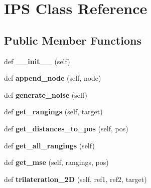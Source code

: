 \hypertarget{class_emulator_1_1_i_p_s}{}\section{I\+PS Class Reference}
\label{class_emulator_1_1_i_p_s}
\subsection*{Public Member Functions}
\begin{DoxyCompactItemize}
\item 
\mbox{\label{class_emulator_1_1_i_p_s_ae64f0875afe3067b97ba370b354b9213}} 
def {\bfseries \+\_\+\+\_\+init\+\_\+\+\_\+} (self)
\item 
\mbox{\label{class_emulator_1_1_i_p_s_ad592726fe518f08b2610e36f73323607}} 
def {\bfseries append\+\_\+node} (self, node)
\item 
\mbox{\label{class_emulator_1_1_i_p_s_ac678816339dde4c5fd312b183fbef3c7}} 
def {\bfseries generate\+\_\+noise} (self)
\item 
\mbox{\label{class_emulator_1_1_i_p_s_a7d42c4dff24af89bed35e9502f4a66d3}} 
def {\bfseries get\+\_\+rangings} (self, target)
\item 
\mbox{\label{class_emulator_1_1_i_p_s_a94acd9ee416f26c86fc973a2bb066bf9}} 
def {\bfseries get\+\_\+distances\+\_\+to\+\_\+pos} (self, pos)
\item 
\mbox{\label{class_emulator_1_1_i_p_s_a5da9a769fdf928d993b2c1d0cb34e293}} 
def {\bfseries get\+\_\+all\+\_\+rangings} (self)
\item 
\mbox{\label{class_emulator_1_1_i_p_s_a8b243ccc14d97410bb4ad831598eb117}} 
def {\bfseries get\+\_\+mse} (self, rangings, pos)
\item 
\mbox{\label{class_emulator_1_1_i_p_s_abdacf9265184f3bf19af84381f22b1a5}} 
def {\bfseries trilateration\+\_\+2D} (self, ref1, ref2, target)
\item 
\mbox{\label{class_emulator_1_1_i_p_s_a5d27fdb963b8cd8548ea5691d46a89fa}} 

\end{DoxyCompactItemize}
